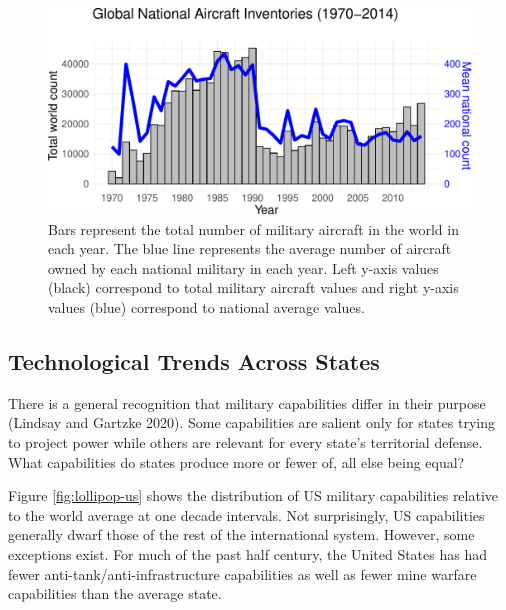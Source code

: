 \documentclass[
]{article}
\begin{document}
\begin{figure}[H]

{\centering \includegraphics{2021-09-24_rDMC_files/figure-latex/aircraft-1} 

}

\caption{Bars represent the total number of military aircraft in the world in each year. The blue line represents the average number of aircraft owned by each national military in each year. Left y-axis values (black) correspond to total military aircraft values and right y-axis values (blue) correspond to national average values.}\label{fig:aircraft}
\end{figure}

\hypertarget{technological-trends-across-states}{%
\subsection{Technological Trends Across States}\label{technological-trends-across-states}}

There is a general recognition that military capabilities differ in their purpose (Lindsay and Gartzke 2020). Some capabilities are salient only for states trying to project power while others are relevant for every state's territorial defense. What capabilities do states produce more or fewer of, all else being equal?

Figure \ref{fig:lollipop-us} shows the distribution of US military capabilities relative to the world average at one decade intervals. Not surprisingly, US capabilities generally dwarf those of the rest of the international system. However, some exceptions exist. For much of the past half century, the United States has had fewer anti-tank/anti-infrastructure capabilities as well as fewer mine warfare capabilities than the average state.
\end{document}
